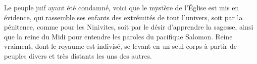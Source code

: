 Le peuple juif ayant été condamné, voici que le mystère de l’Église est mis en évidence, qui rassemble ses enfants des extrémités de tout l’univers, soit par la pénitence, comme pour les Ninivites, soit par le désir d’apprendre la sagesse, ainsi que la reine du Midi pour entendre les paroles du pacifique Salomon. Reine vraiment, dont le royaume est indivisé, se levant en un seul corps à partir de peuples divers et très distants les uns des autres.
